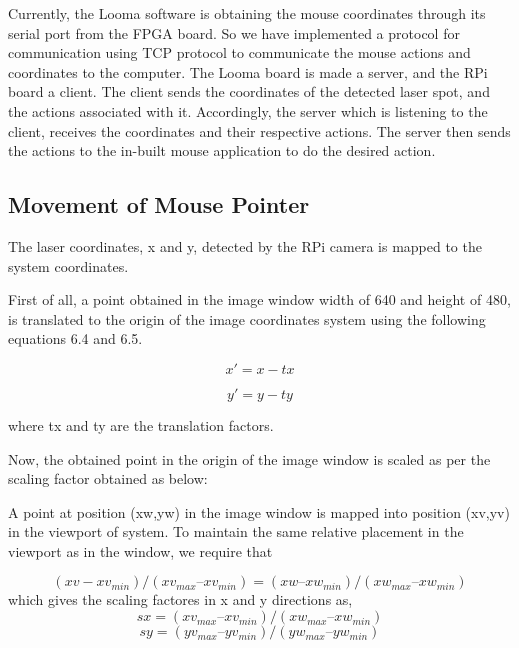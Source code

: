 \documentclass[12pt, a4paper]{article}
\begin{document}
	Currently, the Looma software is obtaining the mouse coordinates through its serial port from the FPGA board. So we have implemented a protocol for communication using TCP protocol to communicate the mouse actions and coordinates to the computer. The Looma board is made a server, and the RPi board a client. The client sends the coordinates of the detected laser spot, and the actions associated with it. Accordingly, the server which is listening to the client, receives the coordinates and their respective actions. The server then sends the actions to the in-built mouse application to do the desired action.


\subsection{Movement of Mouse Pointer}
The laser coordinates, x and y, detected by the RPi camera is mapped to the system coordinates. 

First of all, a point obtained in the image window width of 640 and height of 480, is translated to the origin of the image coordinates system using the following equations 6.4 and 6.5.

\begin{equation}
x' = x - tx
\end{equation}

\begin{equation}
y' = y - ty
\end{equation}

where tx and ty are the translation factors.

Now, the obtained point in the origin of the image window is scaled as per the scaling factor obtained as below:

A point at position (xw,yw) in the image window is mapped into position (xv,yv) in the viewport of system. To maintain the same relative placement in the viewport as in the window, we require that

\begin{equation}
 (xv -xv_{min})/(xv_{max} – xv_{min}) = (xw – xw_{min})/(xw_{max} – xw_{min})
\end{equation}
which gives the scaling factores in x and y directions as,
\begin{equation}
sx = (xv_{max} – xv_{min}) / (xw_{max} – xw_{min})
\end{equation}
\begin{equation}
sy = (yv_{max} – yv_{min}) / (yw_{max} – yw_{min})
\end{equation}
\end{document}
